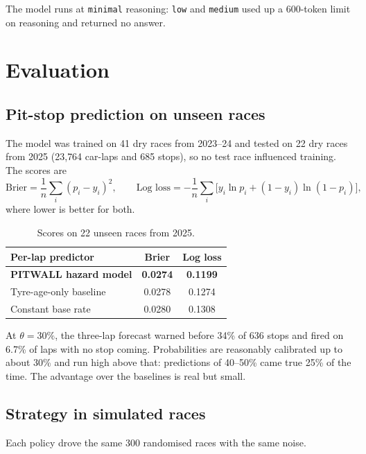 \documentclass[11pt,a4paper]{article}
\begin{document}
The model runs at \texttt{minimal} reasoning: \texttt{low} and \texttt{medium} used up a 600-token
limit on reasoning and returned no answer.

\section{Evaluation}

\subsection{Pit-stop prediction on unseen races}
The model was trained on 41 dry races from 2023--24 and tested on 22 dry races from 2025
(23{,}764 car-laps and 685 stops), so no test race influenced training. The scores are
\begin{equation}
\text{Brier} = \frac{1}{n}\sum_i (p_i-y_i)^2,
\qquad
\text{Log loss} = -\frac{1}{n}\sum_i \bigl[y_i\ln p_i + (1-y_i)\ln(1-p_i)\bigr],
\end{equation}
where lower is better for both.

\begin{table}[H]
\centering
\begin{tabular}{@{}lcc@{}}
\toprule
Per-lap predictor & Brier & Log loss \\
\midrule
\textbf{PITWALL hazard model} & \textbf{0.0274} & \textbf{0.1199} \\
Tyre-age-only baseline & 0.0278 & 0.1274 \\
Constant base rate & 0.0280 & 0.1308 \\
\bottomrule
\end{tabular}
\caption{Scores on 22 unseen races from 2025.}
\end{table}

At $\theta = 30\%$, the three-lap forecast warned before 34\% of 636 stops and fired on 6.7\%
of laps with no stop coming. Probabilities are reasonably calibrated up to about 30\% and
run high above that: predictions of 40--50\% came true 25\% of the time. The advantage over
the baselines is real but small.

\subsection{Strategy in simulated races}
Each policy drove the same 300 randomised races with the same noise.
\end{document}
